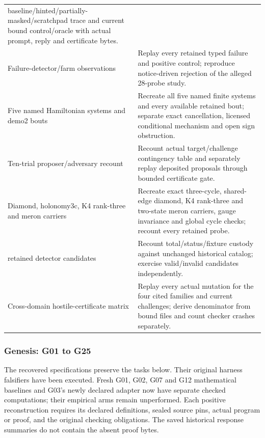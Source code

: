 \documentclass[
  11pt,
]{article}
\begin{document}
\begin{longtable}[]{@{}
  >{\raggedright\arraybackslash}p{}
  >{\raggedright\arraybackslash}p{}@{}}
baseline/hinted/partially-masked/scratchpad trace and current bound
control/oracle with actual prompt, reply and certificate bytes. \\
Failure-detector/farm observations & Replay every retained typed failure
and positive control; reproduce notice-driven rejection of the alleged
28-probe study. \\
Five named Hamiltonian systems and demo2 bouts & Recreate all five named
finite systems and every available retained bout; separate exact
cancellation, licensed conditional mechanism and open sign
obstruction. \\
Ten-trial proposer/adversary recount & Recount actual target/challenge
contingency table and separately replay deposited proposals through
bounded certificate gate. \\
Diamond, holonomy3c, K4 rank-three and meron carriers & Recreate exact
three-cycle, shared-edge diamond, K4 rank-three and two-state meron
carriers, gauge invariance and global cycle checks; recount every
retained probe. \\
61 retained detector candidates & Recount total/status/fixture custody
against unchanged historical catalog; exercise valid/invalid candidates
independently. \\
Cross-domain hostile-certificate matrix & Replay every actual mutation
for the four cited families and current challenges; derive denominator
from bound files and count checker crashes separately. \\
\end{longtable}

\subsubsection{Genesis: G01 to G25}\label{genesis-g01-to-g25}

The recovered specifications preserve the tasks below. Their original
harness falsifiers have been executed. Fresh G01, G02, G07 and G12
mathematical baselines and G03's newly declared adapter now have
separate checked computations; their empirical arms remain unperformed.
Each positive reconstruction requires its declared definitions, sealed
source pins, actual program or proof, and the original checking
obligations. The saved historical response summaries do not contain the
absent proof bytes.
\end{document}
